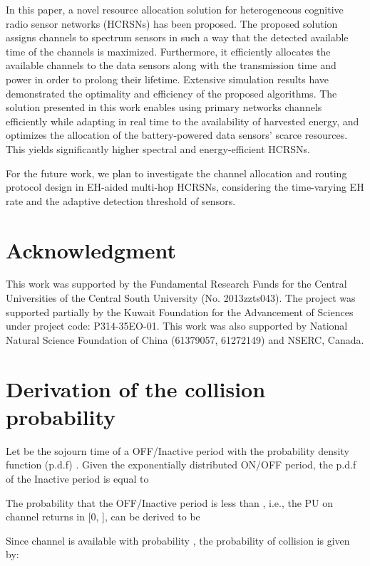 \documentclass[journal]{IEEEtran} \ifCLASSINFOpdf
\begin{document}
In this paper, a novel resource allocation solution for heterogeneous cognitive radio sensor networks (HCRSNs) has been proposed. The proposed solution assigns channels to spectrum sensors in such a way that the detected available time of the channels is maximized. Furthermore, it efficiently allocates the available channels to the data sensors along with the transmission time and power in order to prolong their lifetime. Extensive simulation results have demonstrated the optimality and efficiency of the proposed algorithms. The solution presented in this work enables using primary networks channels efficiently while adapting in real time to the availability of harvested energy, and optimizes the allocation of the battery-powered data sensors' scarce resources. This yields significantly higher spectral and energy-efficient HCRSNs.


For the future work, we plan to investigate the channel allocation and routing protocol design in EH-aided multi-hop HCRSNs, considering the time-varying EH rate and the adaptive detection threshold of sensors.

\section*{Acknowledgment}
This work was supported by the Fundamental Research Funds for the Central Universities of the Central South University (No. 2013zzts043). The project was supported partially by the Kuwait Foundation for the Advancement of Sciences under project code: P314-35EO-01. This work was also supported by National Natural Science Foundation of China (61379057, 61272149) and NSERC, Canada.




\appendices



\section{Derivation of the collision probability }
\label{Apn_col_prob}

Let  be the sojourn time of a OFF/Inactive period with the probability density function (p.d.f) . Given the exponentially distributed ON/OFF period, the p.d.f of the Inactive period is equal to \cite{Kim2008}

The probability that the OFF/Inactive period is less than , i.e., the PU on channel  returns in [0, ], can be derived to be

Since channel  is available with probability , the probability of collision  is given by:
\end{document}
